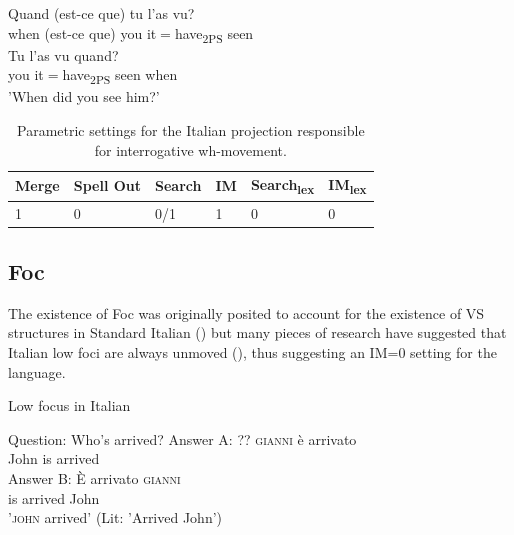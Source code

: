 \documentclass[fleqn,10pt]{wlscirep}
\begin{document}
\begin{exe}
    \ex
        \begin{xlist}
            \ex  \gll Quand (est-ce que) tu l'as vu?\\
            when (est-ce que) you it$=$have\textsubscript{2PS} seen\\
            \ex  \gll Tu l'as vu quand?\\
            you it$=$have\textsubscript{2PS} seen when\\
            \glt 'When did you see him?'
        \end{xlist}
\end{exe}

\begin{table}[H]
    \centering
    \begin{tabular}{|l|l|l|l|l|l|}
    \hline
    Merge & Spell Out & Search & IM & Search\textsubscript{lex} & IM\textsubscript{lex} \\
    \hline
    1 & 0 & 0/1 & 1 & 0 & 0 \\
    \hline
    \end{tabular}
    \caption{\label{tab:samp}Parametric settings for the Italian projection responsible for interrogative wh-movement.}
\end{table}

\subsection*{Foc}

The existence of Foc was originally posited to account for the existence of VS structures in Standard Italian (\citealt{belletti2004}) but many pieces of research have suggested that Italian low foci are always unmoved (\citealt{cardinaletti2001,sameklodovici15,bonan21}), thus suggesting an IM=0 setting for the language. 

\begin{exe}
    \ex Low focus in Italian
    \begin{xlist}
    \ex Question: Who's arrived?
    \ex \gll Answer A: ?? \textsc{gianni} è arrivato\\
    {} {} {} John is arrived\\
    \ex \gll Answer B: È arrivato \textsc{gianni}\\
    {} {} is arrived John\\ 
    \glt \hspace{16mm} '\textsc{john} arrived' (Lit: 'Arrived John')
    \end{xlist}
\end{exe}
\end{document}
